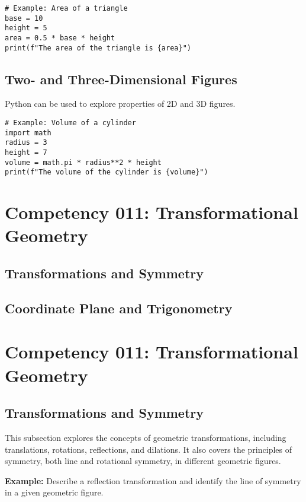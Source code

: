 \documentclass{book}
\begin{document}
\begin{lstlisting}[style=pythonstyle]
# Example: Area of a triangle
base = 10
height = 5
area = 0.5 * base * height
print(f"The area of the triangle is {area}")
\end{lstlisting}


\subsection{Two- and Three-Dimensional Figures}
Python can be used to explore properties of 2D and 3D figures.


\begin{lstlisting}[style=pythonstyle]
# Example: Volume of a cylinder
import math
radius = 3
height = 7
volume = math.pi * radius**2 * height
print(f"The volume of the cylinder is {volume}")
\end{lstlisting}


\section{Competency 011: Transformational Geometry}
\subsection{Transformations and Symmetry}
\subsection{Coordinate Plane and Trigonometry}


\section{Competency 011: Transformational Geometry}


\subsection{Transformations and Symmetry}
This subsection explores the concepts of geometric transformations, including translations, rotations, reflections, and dilations. It also covers the principles of symmetry, both line and rotational symmetry, in different geometric figures.


\textbf{Example:} Describe a reflection transformation and identify the line of symmetry in a given geometric figure.
\end{document}
